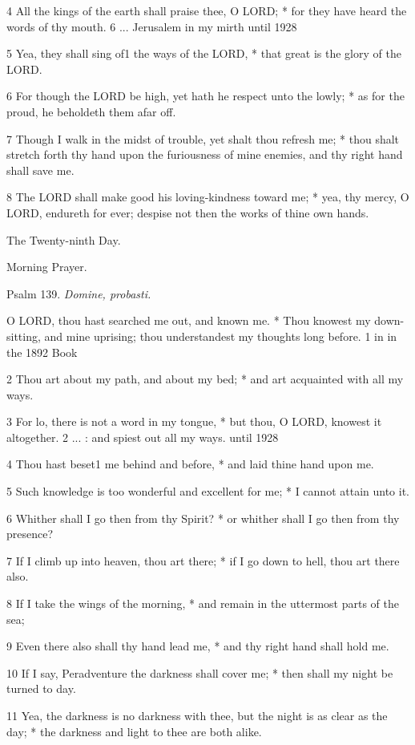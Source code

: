 4 All the kings of the earth shall praise thee, O LORD;
* for they have heard the words of thy mouth. 6 ... Jerusalem in my mirth
until
1928

5 Yea, they shall sing of1 the ways of the LORD, * that great
is the glory of the LORD.

6 For though the LORD be high, yet hath he respect
unto the lowly; * as for the proud, he beholdeth them afar off.

7 Though I walk in the midst of trouble, yet shalt
thou refresh me; * thou shalt stretch forth thy hand upon the furiousness
of mine enemies, and thy right hand shall save me.

8 The LORD shall make good his loving-kindness toward
me; * yea, thy mercy, O LORD, endureth for ever; despise not then the
works of thine own hands. 

The
Twenty-ninth Day.

Morning
Prayer.

Psalm
139. \emph{Domine, probasti.}

O
LORD, thou hast searched me out, and known me. * Thou knowest my down-sitting,
and mine uprising; thou understandest my thoughts long before. 1 in in
the 1892 Book

2 Thou art about my path, and about my bed; * and art acquainted with all
my ways.

3 For lo, there is not a word in my tongue, * but thou,
O LORD, knowest it altogether. 2 ... : and spiest out all
my ways. until
1928

4 Thou hast beset1 me behind and before, * and laid thine hand
upon me.

5 Such knowledge is too wonderful and excellent for me;
* I cannot attain unto it.

6 Whither shall I go then from thy Spirit? * or whither
shall I go then from thy presence?

7 If I climb up into heaven, thou art there; * if I go
down to hell, thou art there also.

8 If I take the wings of the morning, * and remain in
the uttermost parts of the sea;

9 Even there also shall thy hand lead me, * and thy right
hand shall hold me.

10 If I say, Peradventure the darkness shall cover me;
* then shall my night be turned to day.

11 Yea, the darkness is no darkness with thee, but the
night is as clear as the day; * the darkness and light to thee are both
alike.

